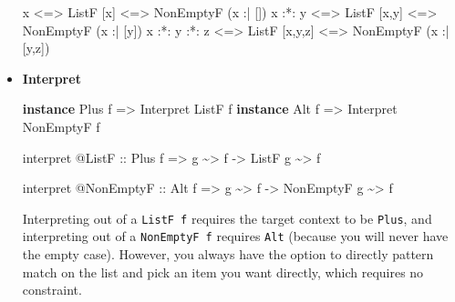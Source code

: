 \documentclass[]{article}
\newenvironment{Shaded}{}{}
\newcommand{\DataTypeTok}[1]{\textcolor[rgb]{0.56,0.13,0.00}{#1}}
\newcommand{\KeywordTok}[1]{\textcolor[rgb]{0.00,0.44,0.13}{\textbf{#1}}}
\newcommand{\NormalTok}[1]{#1}
\newcommand{\OperatorTok}[1]{\textcolor[rgb]{0.40,0.40,0.40}{#1}}
\newcommand{\OtherTok}[1]{\textcolor[rgb]{0.00,0.44,0.13}{#1}}
\begin{document}
\begin{itemize}
\begin{Shaded}
\begin{Highlighting}[]
\NormalTok{x             }\OperatorTok{\textless{}=\textgreater{}} \DataTypeTok{ListF}\NormalTok{ [x]     }\OperatorTok{\textless{}=\textgreater{}} \DataTypeTok{NonEmptyF}\NormalTok{ (x }\OperatorTok{:|}\NormalTok{ [])}
\NormalTok{x }\OperatorTok{:*:}\NormalTok{ y       }\OperatorTok{\textless{}=\textgreater{}} \DataTypeTok{ListF}\NormalTok{ [x,y]   }\OperatorTok{\textless{}=\textgreater{}} \DataTypeTok{NonEmptyF}\NormalTok{ (x }\OperatorTok{:|}\NormalTok{ [y])}
\NormalTok{x }\OperatorTok{:*:}\NormalTok{ y }\OperatorTok{:*:}\NormalTok{ z }\OperatorTok{\textless{}=\textgreater{}} \DataTypeTok{ListF}\NormalTok{ [x,y,z] }\OperatorTok{\textless{}=\textgreater{}} \DataTypeTok{NonEmptyF}\NormalTok{ (x }\OperatorTok{:|}\NormalTok{ [y,z])}
\end{Highlighting}
\end{Shaded}
\item
  \textbf{Interpret}

\begin{Shaded}
\begin{Highlighting}[]
\KeywordTok{instance} \DataTypeTok{Plus}\NormalTok{ f }\OtherTok{=\textgreater{}} \DataTypeTok{Interpret} \DataTypeTok{ListF}\NormalTok{     f}
\KeywordTok{instance} \DataTypeTok{Alt}\NormalTok{  f }\OtherTok{=\textgreater{}} \DataTypeTok{Interpret} \DataTypeTok{NonEmptyF}\NormalTok{ f}

\NormalTok{interpret }\OperatorTok{@}\DataTypeTok{ListF}
\OtherTok{    ::} \DataTypeTok{Plus}\NormalTok{ f}
    \OtherTok{=\textgreater{}}\NormalTok{ g }\OperatorTok{\textasciitilde{}\textgreater{}}\NormalTok{ f}
    \OtherTok{{-}\textgreater{}} \DataTypeTok{ListF}\NormalTok{ g }\OperatorTok{\textasciitilde{}\textgreater{}}\NormalTok{ f}

\NormalTok{interpret }\OperatorTok{@}\DataTypeTok{NonEmptyF}
\OtherTok{    ::} \DataTypeTok{Alt}\NormalTok{ f}
    \OtherTok{=\textgreater{}}\NormalTok{ g }\OperatorTok{\textasciitilde{}\textgreater{}}\NormalTok{ f}
    \OtherTok{{-}\textgreater{}} \DataTypeTok{NonEmptyF}\NormalTok{ g }\OperatorTok{\textasciitilde{}\textgreater{}}\NormalTok{ f}
\end{Highlighting}
\end{Shaded}

  Interpreting out of a \texttt{ListF\ f} requires the target context to be
  \texttt{Plus}, and interpreting out of a \texttt{NonEmptyF\ f} requires
  \texttt{Alt} (because you will never have the empty case). However, you always
  have the option to directly pattern match on the list and pick an item you
  want directly, which requires no constraint.
\end{itemize}
\end{document}
